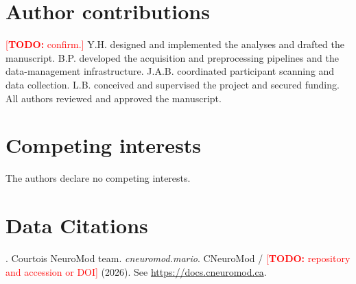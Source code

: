 \documentclass{article}
\newcommand{\TODO}[1]{\textcolor{red}{[\textbf{TODO:} #1]}}
\begin{document}
\section*{Author contributions}
\TODO{confirm.} Y.H. designed and implemented the analyses and drafted the manuscript. B.P.
developed the acquisition and preprocessing pipelines and the data-management infrastructure.
J.A.B. coordinated participant scanning and data collection. L.B. conceived and supervised the
project and secured funding. All authors reviewed and approved the manuscript.

\section*{Competing interests}
The authors declare no competing interests.

\section*{Data Citations}
. Courtois NeuroMod team. \textit{cneuromod.mario}. CNeuroMod / \TODO{repository and accession or
DOI} (2026). See \url{https://docs.cneuromod.ca}.




\end{document}
